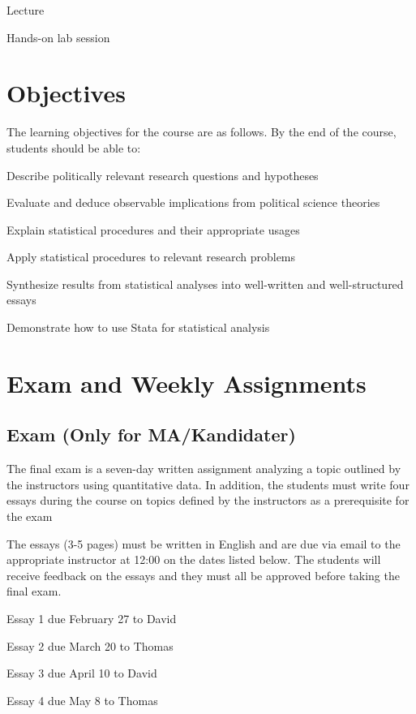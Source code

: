 \documentclass[11pt,a4paper]{article}
\begin{document}
\begin{itemize*}
\item Lecture %
\item Hands-on lab session %
\end{itemize*}


\clearpage
\section{Objectives}
The learning objectives for the course are as follows. By the end of the course, students should be able to:

\begin{enumerate*}
\item Describe politically relevant research questions and hypotheses
\item Evaluate and deduce observable implications from political science theories 
\item Explain statistical procedures and their appropriate usages
\item Apply statistical procedures to relevant research problems
\item Synthesize results from statistical analyses into well-written and well-structured essays
\item Demonstrate how to use Stata for statistical analysis
\end{enumerate*}

\section{Exam and Weekly Assignments}

\subsection{Exam (Only for MA/Kandidater)}
The final exam is a seven-day written assignment analyzing a topic outlined by the instructors using quantitative data. In addition, the students must write four essays during the course on topics defined by the instructors as a prerequisite for the exam

The essays (3-5 pages) must be written in English and are due via email to the appropriate instructor at 12:00 on the dates listed below. The students will receive feedback on the essays and they must all be approved before taking the final exam.

\begin{enumerate*}
\item Essay 1 due February 27 to David %
\item Essay 2 due March 20 to Thomas %
\item Essay 3 due April 10 to David %
\item Essay 4 due May 8 to Thomas %
\end{enumerate*}
\end{document}
